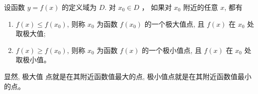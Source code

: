 设函数 $y=f(x)$ 的定义域为 $D$. 对 $x_{0} \in D$ ， 如果对 $x_{0}$ 附近的任意 $x$, 都有\cite{高存明选择性必修三}
\begin{enumerate}[(1)]
  \item $f(x) \leq f\left(x_{0}\right)$, 则称 $x_{0}$ 为函数 $f\left(x_{0}\right)$ 的一个极大值点, 且 $f(x)$ 在 $x_{0}$ 处取极大值;
  \item $f(x) \geq f\left(x_{0}\right)$, 则称 $x_{0}$ 为函数 $f(x)$ 的一个极小值点, 且 $f(x)$ 在 $x_{0}$ 处取极小值。
\end{enumerate}

显然, 极大值 点就是在其附近函数值最大的点, 极小值点就是在其附近函数值最小的点。



